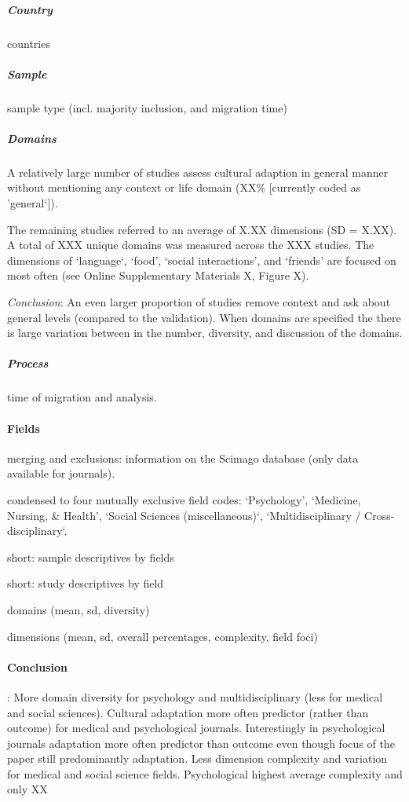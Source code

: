 \documentclass[man, 12pt, a4paper]{apa7}
\begin{document}
\subparagraph{Country}
countries

\subparagraph{Sample}
sample type (incl. majority inclusion, and migration time)

\subparagraph{Domains}
A relatively large number of studies assess cultural adaption in general manner without mentioning any context or life domain (XX\% [currently coded as 'general‘]).

The remaining studies referred to an average of X.XX dimensions (SD = X.XX). A total of XXX unique domains was measured across the XXX studies. The dimensions of ‘language‘, ‘food’, ‘social interactions’, and ‘friends’ are focused on most often (see Online Supplementary Materials X, Figure X).

\textit{Conclusion}: An even larger proportion of studies remove context and ask about general levels (compared to the validation). When domains are specified the there is large variation between in the number, diversity, and discussion of the domains.

\subparagraph{Process}
time of migration and analysis.

\paragraph{Fields}
merging and exclusions: information on the Scimago database (only data available for journals).

condensed to four mutually exclusive field codes: ‘Psychology’, ‘Medicine, Nursing, \& Health’, ‘Social Sciences (miscellaneous)‘, ‘Multidisciplinary / Cross-disciplinary‘.

short: sample descriptives by fields

short: study descriptives by field

domains (mean, sd, diversity)

dimensions (mean, sd, overall percentages, complexity, field foci)

\paragraph{Conclusion}: More domain diversity for psychology and multidisciplinary (less for medical and social sciences). Cultural adaptation more often predictor (rather than outcome) for medical and psychological journals. Interestingly in psychological journals adaptation more often predictor than outcome even though focus of the paper still predominantly adaptation. Less dimension complexity and variation for medical and social science fields. Psychological highest average complexity and only XX%
\end{document}
